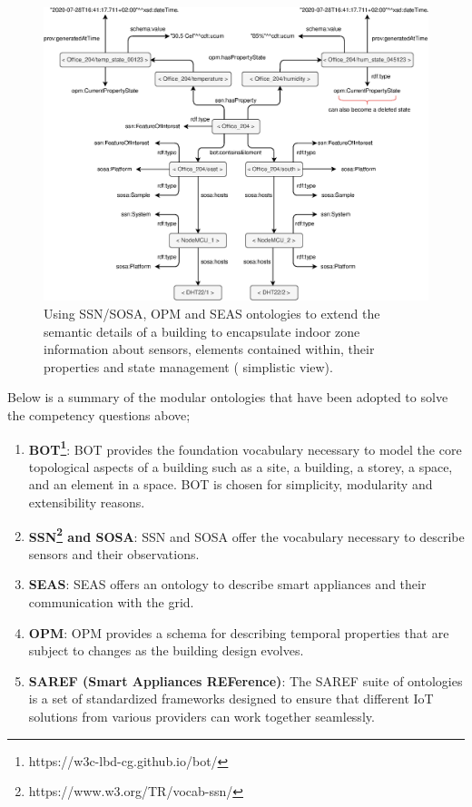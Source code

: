 \begin{figure}[htbp]
    \centering
    \includegraphics[width=1\textwidth]{figures/SSN_OPM_SEAS.eps}
    \caption{Using SSN/SOSA, OPM and SEAS ontologies to extend the semantic details of a building to encapsulate indoor zone information about sensors, elements contained within, their properties and state management ( simplistic view).} \label{SSN_OPM_SEAS}
\end{figure}

Below is a summary of the modular ontologies that have been adopted to solve the competency questions above;
\begin{enumerate}
    \item 
    \textbf{\acf{BOT}\footnote{https://w3c-lbd-cg.github.io/bot/}}: \ac{BOT} \citep{Rasmussen2017} provides the foundation vocabulary necessary to model the core topological aspects of a building such as a site, a building, a storey, a space, and an element in a space. \ac{BOT} is chosen for simplicity, modularity and extensibility reasons.

    \item 
    \textbf{\acf{SSN}\footnote{https://www.w3.org/TR/vocab-ssn/} and \acf{SOSA}}: \ac{SSN} and \ac{SOSA} \citep{Haller2017} offer the vocabulary necessary to describe sensors and their observations.

    \item
    \textbf{\ac{SEAS}}: \ac{SEAS} \citep{Lefrancois2016} offers an ontology to describe smart appliances and their communication with the grid.

    \item 
    \textbf{\ac{OPM}}: \ac{OPM} \citep{Rasmussen2018a} provides a schema for describing temporal properties that are subject to changes as the building design evolves.

    \item 
    \textbf{SAREF (Smart Appliances REFerence)}: The \ac{SAREF} \citep{Daniele2015} suite of ontologies is a set of standardized frameworks designed to ensure that different \ac{IoT} solutions from various providers can work together seamlessly.
\end{enumerate}

